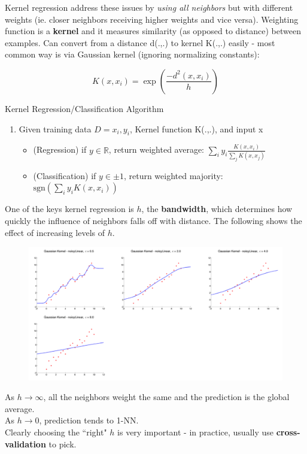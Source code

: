 \documentclass[a4paper]{article}\usepackage[]{graphicx}\usepackage[]{color}
\begin{document}
Kernel regression address these issues by \emph{using all neighbors} but with different weights (ie. closer neighbors receiving higher weights and vice versa). Weighting function is a \textbf{kernel} and it measures similarity (as opposed to distance) between examples. Can convert from a distance d(.,.) to kernel K(.,.) easily - most common way is via Gaussian kernel (ignoring normalizing constants):

\begin{equation*}
K(x,x_i) = \exp\left(\frac{-d^2(x,x_i)}{h}\right)
\end{equation*}

Kernel Regression/Classification Algorithm
\begin{enumerate}
\item Given training data $D={x_i,y_i}$, Kernel function K(.,.), and input x
\begin{itemize}
\item (Regression) if $y \in \mathbb{R}$, return weighted average: $\sum_i y_i \frac{K(x,x_i)}{\sum_j K(x,x_j)}$
\item (Classification) if $y \in \pm 1$, return weighted majority: $\mbox{sgn}\left(\sum_i y_iK(x,x_i)\right)$
\end{itemize}
\end{enumerate}

One of the keys kernel regression is $h$, the \textbf{bandwidth}, which determines how quickly the influence of neighbors falls off with distance. The following shows the effect of increasing levels of $h$. 

\begin{figure}[H]
\centering
\includegraphics[width=6in]{kernel_reg.png}
\end{figure}

As $h \rightarrow \infty$, all the neighbors weight the same and the prediction is the global average. \\
As $h \rightarrow 0$, prediction tends to 1-NN. \\
Clearly choosing the ``right" $h$ is very important - in practice, usually use \textbf{cross-validation} to pick.
\end{document}
